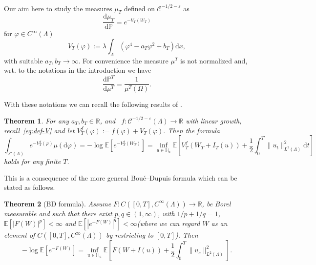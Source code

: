 \documentclass[11pt]{article}
\newcommand{\assign}{:=}
\newcommand{\mathd}{\mathrm{d}}
\newtheorem{theorem}{Theorem}
\newcommand{\VV}{\mathscr{C}}
\newcommand{\CS}{\mathscr{S}}
\begin{document}
\

Our aim here to study the measures $\mu_T$ defined on $\VV^{- 1 / 2 -
\varepsilon}$ as
\[ \frac{\mathd \mu_T}{\mathd \mathbb{P}} = e^{- V_T (W_T)} \]
for $\varphi \in C^{\infty} (\Lambda)$
\begin{equation}
  V_T (\varphi) \assign \lambda \int_{\Lambda} (\varphi^4 - a_T \varphi^2 +
  b_T) \mathd x, \label{eq:def-V}
\end{equation}
with suitable $a_T, b_T \rightarrow \infty$. For convenience the measure
$\mu^T$ is not normalized and, wrt. to the notations in the introduction we
have
\[ \frac{\mathd \mathbb{P}^T}{\mathd \mu^T} = \frac{1}{\mu^T (\Omega)} . \]


With these notations we can recall the following results of
{\cite{barashkov_gubinelli_variational}}.

\begin{theorem}
  \label{eq:th1}For any $a_T, b_T \in \mathbb{R}$, and \ $f : \VV^{- 1 / 2 -
  \varepsilon} (\Lambda) \rightarrow \mathbb{R}$ with linear growth,
  recall~{\eqref{eq:def-V}} and let $V^f_T (\varphi) \assign f (\varphi) + V_T
  (\varphi) .$ Then the formula
  \begin{equation}
    \int_{\CS' (\Lambda)} e^{- V^f_T (\varphi)} \mu (\mathd \varphi) = -
    \log \mathbb{E} [e^{- V^f_T (W_T)}] = \inf_{u \in \mathbb{H}_a} \mathbb{E}
    \left[ V^f_T (W_T + I_T (u)) + \frac{1}{2} \int^T_0 \| u_t \|^2_{L^2
    (\Lambda)} \mathd t \right] \label{eq:contr-prob}
  \end{equation}
  holds for any finite $T$.
\end{theorem}

This is a consequence of the more general Bou{\'e}--Dupuis formula which can
be stated as follows.

\begin{theorem}[BD formula]
  Assume $F : C ([0, T], C^{\infty} (\Lambda)) \rightarrow \mathbb{R}$, be
  Borel measurable and such that there exist $p, q \in (1, \infty)$, with $1 /
  p + 1 / q = 1$, $\mathbb{E} [| F (W) |^p] < \infty$ and $\mathbb{E} [| e^{-
  F (W)} |^q] < \infty$(where we can regard $W$ as an element of $C ([0, T],
  C^{\infty} (\Lambda))$ by restricting to $[0, T]$). Then
  \begin{equation}
    - \log \mathbb{E} [e^{- F (W)}] = \inf_{u \in \mathbb{H}_a} \mathbb{E}
    \left[ F (W + I (u)) + \frac{1}{2} \int^T_0 \| u_s \|_{L^2 (\Lambda)}^2
    \right] . \label{eq:bd}
  \end{equation}
\end{theorem}
\end{document}
